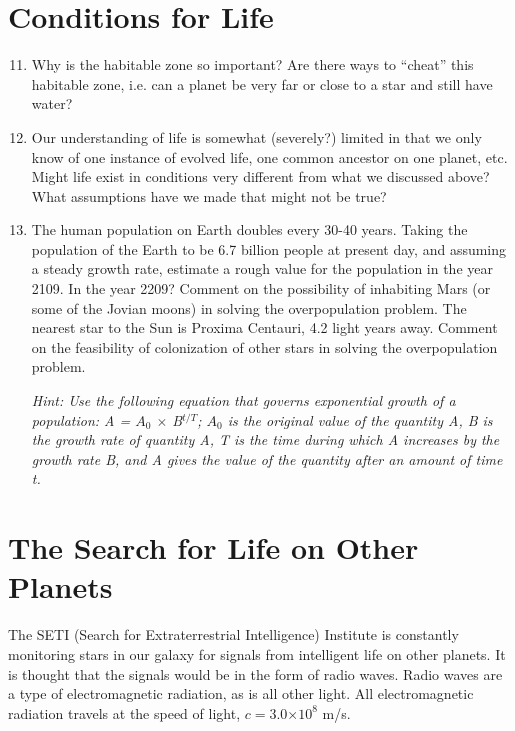 \documentclass[12pt]{article}%
\providecommand{\e}[1]{\ensuremath{\times 10^{#1}}} %
\begin{document}
\section{Conditions for Life}
\begin{enumerate}
\setcounter{enumi}{10} 

\item Why is the habitable zone so important? Are there ways to ``cheat'' this habitable zone, i.e. can a planet be very far or close to a star and still have water?

\item Our understanding of life is somewhat (severely?) limited in that we only know of one instance of evolved life, one common ancestor on one planet, etc.  Might life exist in conditions very different from what we discussed above? What assumptions have we made that might not be true?

\item The human population on Earth doubles every 30-40 years.  Taking the population of the Earth to be 6.7 billion people at present day, and assuming a steady growth rate, estimate a rough value for the population in the year 2109.  In the year 2209?  Comment on the possibility of inhabiting Mars (or some of the Jovian moons) in solving the overpopulation problem.  The nearest star to the Sun is Proxima Centauri, 4.2 light years away.  Comment on the feasibility of colonization of other stars in solving the overpopulation problem.

\emph{Hint:  Use the following equation that governs exponential growth of a population:  A = $A_0$ $\times$ B$^{t/T}$; $A_0$ is the original value of the quantity A, B is the growth rate of quantity A, T is the time during which A increases by the growth rate B, and A gives the value of the quantity after an amount of time t.} 
\end{enumerate}

\section{The Search for Life on Other Planets}
The SETI (Search for Extraterrestrial Intelligence) Institute is constantly monitoring stars in our galaxy for signals from intelligent life on other planets.  
It is thought that the signals would be in the form of radio waves.  
Radio waves are a type of electromagnetic radiation, as is all other light.  
All electromagnetic radiation travels at the speed of light, $c=3.0 \e{8}$ m/s. 
\end{document}
